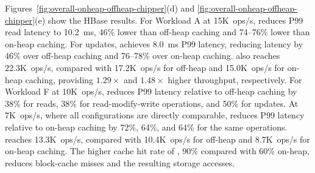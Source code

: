 Figures~\ref{fig:overall-onheap-offheap-chipper}(d) and \ref{fig:overall-onheap-offheap-chipper}(e) show the HBase results.
For Workload A at 15K~ops/s, \chipperName{} reduces P99 read latency to 10.2~ms, 46\% lower than off-heap caching and 74--76\% lower than on-heap caching.
For updates, \chipperName{} achieves 8.0~ms P99 latency, reducing latency by 46\% over off-heap caching and 76--78\% over on-heap caching.
\chipperName{} also reaches 22.3K~ops/s, compared with 17.2K~ops/s for off-heap and 15.0K~ops/s for on-heap caching, providing $1.29\times$ and $1.48\times$ higher throughput, respectively.
For Workload F at 10K~ops/s, \chipperName{} reduces P99 latency relative to off-heap caching by 38\% for reads, 38\% for read-modify-write operations, and 50\% for updates.
At 7K~ops/s, where all configurations are directly comparable, \chipperName{} reduces P99 latency relative to on-heap caching by 72\%, 64\%, and 64\% for the same operations.
\chipperName{} reaches 13.3K~ops/s, compared with 10.4K~ops/s for off-heap and 8.7K~ops/s for on-heap caching.
The higher cache hit rate of \chipperName{}, 90\% compared with 60\% on-heap, reduces block-cache misses and the resulting storage accesses.

